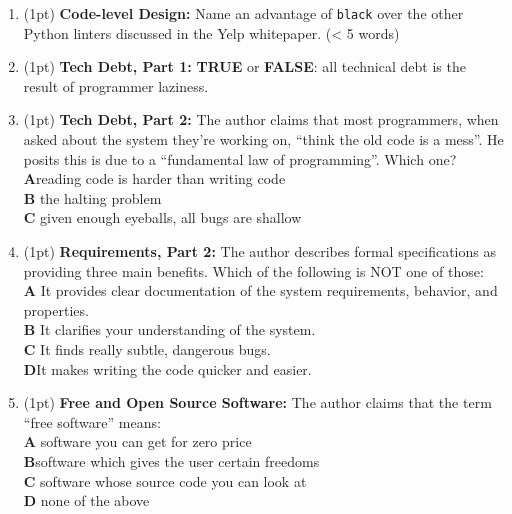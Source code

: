 \documentclass{report}
\newif\ifkey
\newcommand{\correct}[1]{\ifkey\color{red}\textbf{#1}\color{black}\else\textbf{#1}\fi\xspace}
\newcommand{\answershort}[1]{\ifkey\color{red}\underline{\textbf{#1}}\color{black}\else\underline{\hspace{3in}}\fi\xspace}
\newcommand*{\pts}[1]{\addtocounter{points}{#1}(#1pt)}
\begin{document}
\begin{spacing}{1.4}
\begin{enumerate}[leftmargin=*]
\item \pts{1}
  \textbf{Code-level Design:} Name an advantage of \texttt{black} over the other Python linters discussed in the Yelp whitepaper. (< 5 words)
  \\ \answershort{any of: opinionated; resolves errors automatically; consistency}

\item \pts{1}
  \textbf{Tech Debt, Part 1:} \textbf{TRUE} or \correct{FALSE}:
  all technical debt is the result of programmer laziness.

\item \pts{1}
  \textbf{Tech Debt, Part 2:}
  The author claims that most programmers, when asked about the system they’re working on, “think the old code is a mess”. He posits this is due to a “fundamental law of programming”. Which one?
  \\ \correct{A}\hspace{0.2in}reading code is harder than writing code
  \\ \textbf{B}\hspace{0.2in} the halting problem
  \\ \textbf{C}\hspace{0.2in} given enough eyeballs, all bugs are shallow

\item \pts{1}
  \textbf{Requirements, Part 2:}
  The author describes formal specifications as providing three main benefits. Which of the following is NOT one of those:
  \\ \textbf{A}\hspace{0.2in} It provides clear documentation of the system requirements, behavior, and properties.
  \\ \textbf{B}\hspace{0.2in} It clarifies your understanding of the system.
  \\ \textbf{C}\hspace{0.2in} It finds really subtle, dangerous bugs.
  \\ \correct{D}\hspace{0.2in}It makes writing the code quicker and easier.

\item \pts{1}
  \textbf{Free and Open Source Software:}
  The author claims that the term “free software” means:
  \\ \textbf{A}\hspace{0.2in} software you can get for zero price
  \\ \correct{B}\hspace{0.2in}software which gives the user certain freedoms
  \\ \textbf{C}\hspace{0.2in} software whose source code you can look at
  \\ \textbf{D}\hspace{0.2in} none of the above


\end{enumerate}
\end{spacing}
\end{document}
